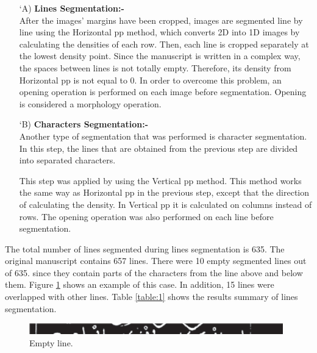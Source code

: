 \begin{itemize}[labelindent=1em,labelsep=0.25cm,leftmargin=*]

        \item[\char `A)] \textbf{Lines Segmentation:-}\\
         After the images’ margins have been cropped, images are segmented line by line using the Horizontal \acrshort{pp} method, which converts 2D into 1D images by calculating the densities of each row. Then, each line is cropped separately at the lowest density point. Since the manuscript is written in a complex way, the spaces between lines is not totally empty. Therefore, its density from Horizontal \acrshort{pp} is not equal to 0. In order to overcome this problem, an opening operation is performed on each image before segmentation. Opening is considered a morphology operation.
        
        \item[\char `B)] \textbf{Characters Segmentation:-}\\
        Another type of segmentation that was performed is character segmentation. In this step, the lines that are obtained from the previous step are divided into separated characters.
        
        This step was applied by using the Vertical \acrshort{pp} method. This method works the same way as Horizontal \acrshort{pp} in the previous step, except that the direction of calculating the density. In Vertical \acrshort{pp} it is calculated on columns instead of rows. The opening operation was also performed on each line before segmentation.
    \end{itemize}

\noindent
The total number of lines segmented during lines segmentation is 635. The original manuscript contains 657 lines. There were 10 empty segmented lines out of 635. since they contain
parts of the characters from the line above and below them.
Figure \ref{fig:pp_empty} shows an example of this case. In addition, 15 lines
were overlapped with other lines. Table \ref{table:1} shows the results
summary of lines segmentation.

\begin{figure}[!htb]
    \centering
    \includegraphics[width=11cm]{images/pp_empty.png}
    \caption{Empty line.}
    \label{fig:pp_empty}
\end{figure}

